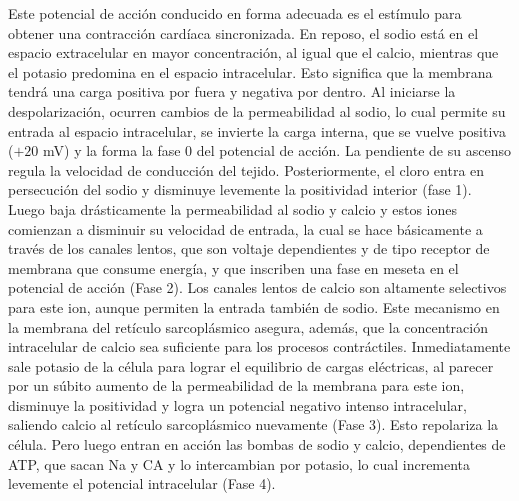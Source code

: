 \documentclass[12pt,letterpaper,oneside,openright]{book}
\begin{document}
	Este potencial de acción conducido en forma adecuada es el estímulo para obtener una contracción cardíaca sincronizada. En reposo, el sodio está en el espacio extracelular en mayor concentración, al igual que el calcio, mientras que el potasio predomina en el espacio intracelular. Esto significa que la membrana tendrá una carga positiva por fuera y negativa por dentro. Al iniciarse la despolarización, ocurren cambios de la permeabilidad al sodio, lo cual permite su entrada al espacio intracelular, se invierte la carga interna, que se vuelve positiva ($+20$ mV) y la forma la fase 0 del potencial de acción. La pendiente de su ascenso regula la velocidad de conducción del tejido. Posteriormente, el cloro entra en persecución del sodio y disminuye levemente la positividad interior (fase 1). Luego baja drásticamente la permeabilidad al sodio y calcio y estos iones comienzan a disminuir su velocidad de entrada, la cual se hace básicamente a través de los canales lentos, que son voltaje dependientes y de tipo receptor de membrana que consume energía, y que inscriben una fase en meseta en el potencial de acción (Fase 2). Los canales lentos de calcio son altamente selectivos para este ion, aunque permiten la entrada también de sodio. Este mecanismo en la membrana del retículo sarcoplásmico asegura, además, que la concentración intracelular de calcio sea suficiente para los procesos contráctiles. Inmediatamente sale potasio de la célula para lograr el equilibrio de cargas eléctricas, al parecer por un súbito aumento de la permeabilidad de la membrana para este ion, disminuye la positividad y logra un potencial negativo intenso intracelular, saliendo calcio al retículo sarcoplásmico nuevamente (Fase 3). Esto repolariza la célula. Pero luego entran en acción las bombas de sodio y calcio, dependientes de ATP, que sacan Na y CA y lo intercambian por potasio, lo cual incrementa levemente el potencial intracelular (Fase 4).
	
\end{document}

